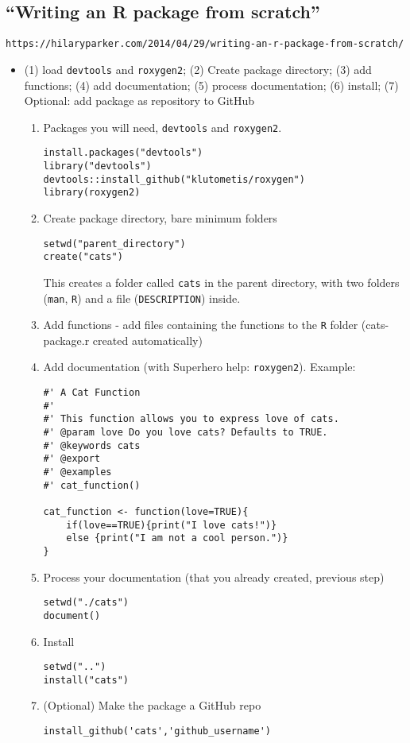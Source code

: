 \documentclass{article}
\begin{document}
\subsection*{``Writing an R package from scratch''}
\verb|https://hilaryparker.com/2014/04/29/writing-an-r-package-from-scratch/|
\begin{itemize}
\item (1) load \verb|devtools| and \verb|roxygen2|; (2) Create package directory; (3) add functions; (4) add documentation; (5) process documentation; (6) install; (7) Optional: add package as repository to GitHub
\begin{enumerate}
\item Packages you will need, \verb|devtools| and \verb|roxygen2|.
\begin{verbatim}
install.packages("devtools")
library("devtools")
devtools::install_github("klutometis/roxygen")
library(roxygen2)
\end{verbatim}
\item Create package directory, bare minimum folders
\begin{verbatim}
setwd("parent_directory")
create("cats")
\end{verbatim}
This creates a folder called \verb|cats| in the parent directory, with two folders (\verb|man|, \verb|R|) and a file (\verb|DESCRIPTION|) inside.
\item Add functions - add files containing the functions to the \verb|R| folder (cats-package.r created automatically)
\item Add documentation (with Superhero help: \verb|roxygen2|). Example:
\begin{verbatim}
#' A Cat Function
#'
#' This function allows you to express love of cats.
#' @param love Do you love cats? Defaults to TRUE.
#' @keywords cats
#' @export
#' @examples
#' cat_function()

cat_function <- function(love=TRUE){
    if(love==TRUE){print("I love cats!")}
    else {print("I am not a cool person.")}
}
\end{verbatim}
\item Process your documentation (that you already created, previous step)
\begin{verbatim}
setwd("./cats")
document()
\end{verbatim}
\item Install
\begin{verbatim}
setwd("..")
install("cats")
\end{verbatim}
\item (Optional) Make the package a GitHub repo
\begin{verbatim}
install_github('cats','github_username')
\end{verbatim}
\end{enumerate}
\end{itemize}
\end{document}
